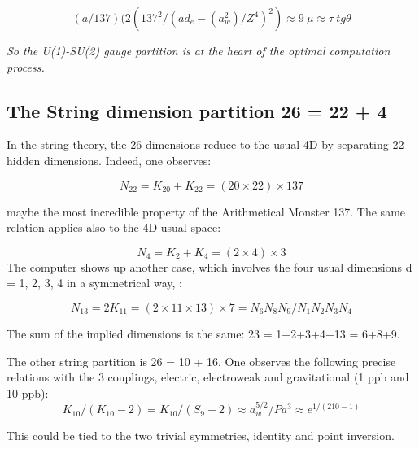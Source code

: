 \documentclass[a4paper,9pt]{article}
\newcounter{row}
\begin{document}
 \begin{equation}
 (a/137)(2(137^2/(ad_e -(a_w^2)/Z^4)^2) \approx 9~\mu \approx \tau~ tg \theta
 \end{equation}
 
 \textit{So the U(1)-SU(2) gauge partition is at the heart of the optimal computation process.}
 
 
 
 
 \subsection{The String dimension partition 26 = 22 + 4}
In the string theory, the 26 dimensions reduce to the usual 4D by separating 22 hidden dimensions. Indeed, one observes:

\begin{equation}
 N_{22}  = K_{20} + K_{22} = (20\times 22) \times 137
 \end{equation}

maybe the most incredible property of the Arithmetical Monster 137. The same relation applies also to the 4D usual space:

\begin{equation}
 N_4  = K_2 + K_4 = (2\times 4) \times 3
 \end{equation}
%
The computer shows up another case, which involves the four usual dimensions d = 1, 2, 3, 4 in a symmetrical way, :

\begin{equation}
 N_{13}  = 2K_{11} = (2\times 11 \times 13)\times 7 = N_6N_8N_9/N_1N_2N_3N_4
 \end{equation}

The sum of the implied dimensions is the same: 23 = 1+2+3+4+13 = 6+8+9. 

The other string partition is 26 = 10 + 16. One observes the following precise relations with the 3 couplings, electric, electroweak and gravitational (1 ppb and 10 ppb):
\begin{equation}
K_{10}/(K_{10}-2) = K_{10}/(S_9+2) \approx a_w^{5/2}/ P a^3   \approx e^{1/(210-1)}
 \end{equation}

This could be tied to the two trivial symmetries, identity and point inversion. 
 

\end{document}
